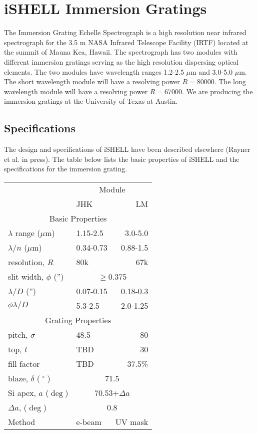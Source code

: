 \chapter{iSHELL Immersion Gratings}

The Immersion Grating Echelle Spectrograph is a high resolution near infrared spectrograph for the 3.5 m NASA Infrared Telescope Facility (IRTF) located at the summit of Mauna Kea, Hawaii.  The spectrograph has two modules with different immersion gratings serving as the high resolution dispersing optical elements.  The two modules have wavelength ranges 1.2-2.5 $\mu$m and 3.0-5.0 $\mu$m.  The short wavelength module will have a resolving power $R=80000$.  The long wavelength module will have a resolving power $R=67000$.  We are producing the immersion gratings at the University of Texas at Austin.

\section{Specifications}
The design and specifications of iSHELL have been described elsewhere (Rayner et al. in press).  The table below lists the basic properties of iSHELL and the specifications for the immersion grating.

\begin{tabular}{llr}
\hline
& \multicolumn{2}{c}{Module} \\
\cline{2-3}
	 & JHK & LM  \\
\hline
\multicolumn{3}{c}{Basic Properties} \\
\hline
$\lambda$ range ($\mu$m) & 1.15-2.5 & 3.0-5.0 \\
$\lambda/n$ ($\mu$m) & 0.34-0.73 & 0.88-1.5 \\
resolution, $R$ & 80k & 67k \\
slit width, $\phi$ ('') & \multicolumn{2}{c}{$\ge$0.375} \\
$\lambda/D$ ('') & 0.07-0.15 & 0.18-0.3 \\
$\phi \lambda/D$ & 5.3-2.5 & 2.0-1.25 \\
\hline
\multicolumn{3}{c}{Grating Properties} \\
\hline
pitch, $\sigma$ & 48.5 & 80 \\
top, $t$ & TBD & 30 \\
fill factor & TBD & 37.5\% \\
blaze, $\delta$ ($\;^\circ \;$) & \multicolumn{2}{c}{71.5} \\
Si apex, $a$ ($\deg$) & \multicolumn{2}{c}{70.53+$\Delta a$} \\
$\Delta a$, ($\deg$) & \multicolumn{2}{c}{0.8} \\
Method  & e-beam & UV mask \\
\hline
\end{tabular}

